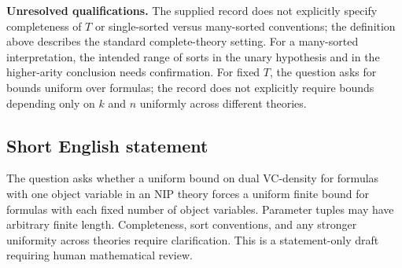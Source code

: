 \documentclass[11pt]{article}
\begin{document}
\textbf{Unresolved qualifications.} The supplied record does not explicitly specify completeness of \(T\) or single-sorted versus many-sorted conventions; the definition above describes the standard complete-theory setting. For a many-sorted interpretation, the intended range of sorts in the unary hypothesis and in the higher-arity conclusion needs confirmation. For fixed \(T\), the question asks for bounds uniform over formulas; the record does not explicitly require bounds depending only on \(k\) and \(n\) uniformly across different theories.
\subsection{Short English statement}
The question asks whether a uniform bound on dual VC-density for formulas with one object variable in an NIP theory forces a uniform finite bound for formulas with each fixed number of object variables. Parameter tuples may have arbitrary finite length. Completeness, sort conventions, and any stronger uniformity across theories require clarification. This is a statement-only draft requiring human mathematical review.
\end{document}
